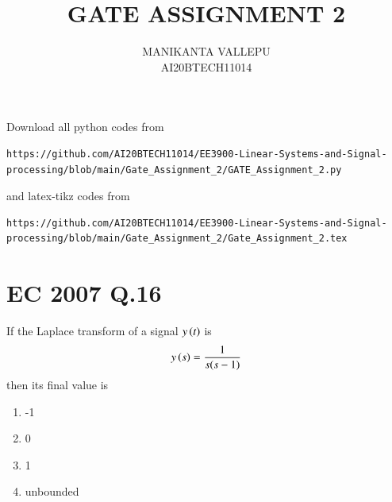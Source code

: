 \documentclass[journal,12pt,twocolumn]{IEEEtran}
\begin{document}
     \def\centbox#1{\makebox[0in]{#1}}
     \def\topbox#1{\raisebox{-\baselineskip}[0in][0in]{#1}}
     \def\midbox#1{\raisebox{-0.5\baselineskip}[0in][0in]{#1}}
\vspace{3cm}
\title{GATE ASSIGNMENT 2}
\author{MANIKANTA VALLEPU \\ AI20BTECH11014}
\maketitle
\newpage
\bigskip
\renewcommand{\thefigure}{\theenumi}
\renewcommand{\thetable}{\theenumi}
Download all python codes from 
\begin{lstlisting}
https://github.com/AI20BTECH11014/EE3900-Linear-Systems-and-Signal-processing/blob/main/Gate_Assignment_2/GATE_Assignment_2.py
\end{lstlisting}
%
and latex-tikz codes from 
%
\begin{lstlisting}
https://github.com/AI20BTECH11014/EE3900-Linear-Systems-and-Signal-processing/blob/main/Gate_Assignment_2/Gate_Assignment_2.tex
\end{lstlisting}
%
\section{EC 2007 Q.16}
If the Laplace transform of a signal $y\left(t\right)$ is $$y\left(s\right)=\dfrac{1}{s(s-1)}$$then its final value is 
\begin{enumerate}
    \item -1
    \item 0
    \item 1
    \item unbounded
\end{enumerate}
\end{document}
